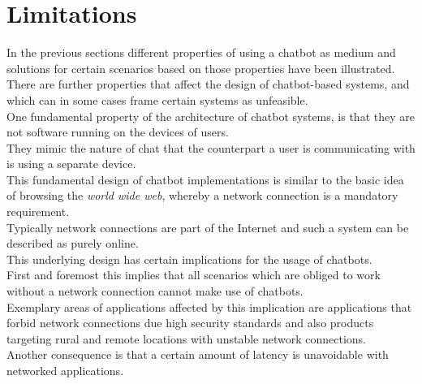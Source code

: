 \section{Limitations}


In the previous sections different properties of using a chatbot as medium
and solutions for certain scenarios based on those properties have been illustrated.
\\

There are further properties that affect the design of chatbot-based systems,
and which can in some cases frame certain systems as unfeasible.
\\

One fundamental property of the architecture of chatbot systems,
is that they are not software running on the devices of users.
\\
They mimic the nature of chat that the counterpart a user is communicating with is using a separate device.
\\
This fundamental design of chatbot implementations is similar to the basic
idea of browsing the \emph{world wide web}, whereby a network connection is a mandatory requirement.
\\
Typically network connections are part of the Internet
and such a system can be described as purely online.
\\

This underlying design has certain implications for the usage of chatbots.
\\

First and foremost this implies that all scenarios which are obliged to work without a network connection
cannot make use of chatbots.
\\
Exemplary areas of applications affected by this implication are
applications that forbid network connections due high security standards
and also products targeting rural and remote locations with unstable network connections.
\\

Another consequence is that a certain amount of latency is unavoidable with networked applications.
\\


